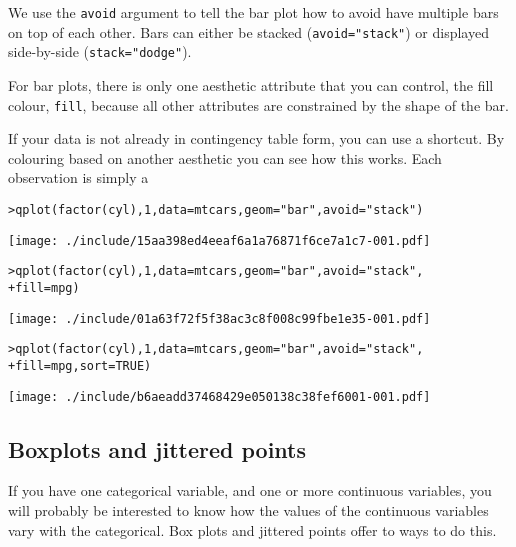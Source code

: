 We use the {\tt avoid} argument to tell the bar plot how to avoid have multiple bars on top of each other.  Bars can either be stacked ({\tt avoid="stack"}) or displayed side-by-side ({\tt stack="dodge"}).  

For bar plots, there is only one aesthetic attribute that you can control, the fill colour, {\tt fill}, because all other attributes are constrained by the shape of the bar.

If your data is not already in contingency table form, you can use a shortcut.  By colouring based on another aesthetic you can see how this works.  Each observation is simply a 

\begin{alltt}
> qplot(factor(cyl), 1, data = mtcars, geom = "bar", avoid = "stack")
\end{alltt}
\texttt{[image: ./include/15aa398ed4eeaf6a1a76871f6ce7a1c7-001.pdf]}
\begin{alltt}

> qplot(factor(cyl), 1, data = mtcars, geom = "bar", avoid = "stack", 
+     fill = mpg)
\end{alltt}
\texttt{[image: ./include/01a63f72f5f38ac3c8f008c99fbe1e35-001.pdf]}
\begin{alltt}

> qplot(factor(cyl), 1, data = mtcars, geom = "bar", avoid = "stack", 
+     fill = mpg, sort = TRUE)
\end{alltt}
\texttt{[image: ./include/b6aeadd37468429e050138c38fef6001-001.pdf]}
\begin{alltt}

\end{alltt}

\subsection{Boxplots and jittered points}\label{sub:boxplot}

If you have one categorical variable, and one or more continuous variables, you will probably be interested to know how the values of the continuous variables vary with the categorical.  Box plots and jittered points offer to ways to do this.  

